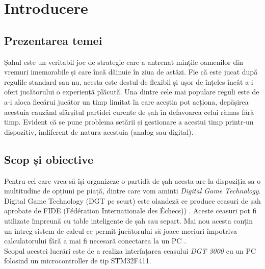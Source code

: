 \chapter{Introducere}
\section{Prezentarea temei}
Șahul este un veritabil joc de strategie care a antrenat mințile oamenilor din vremuri imemorabile și care încă dăinuie în ziua de astăzi. Fie că este jucat după regulile standard sau nu, acesta este destul de flexibil și ușor de înțeles încât a-i oferi jucătorului o experiență plăcută. Una dintre cele mai populare reguli este de a-i aloca fiecărui jucător un timp limitat în care aceștia pot acționa, depășirea acestuia cauzând sfârșitul partidei curente de șah în defavoarea celui rămas fără timp. Evident că se pune problema setării și gestionare a acestui timp printr-un dispozitiv, indiferent de natura acestuia (analog sau digital).

\section{Scop și obiective}
Pentru cel care vrea să își organizeze o partidă de șah acesta are la dispoziția sa o multitudine de opțiuni pe piață, dintre care vom aminti \textit{Digital Game Technology}. Digital Game Technology (DGT pe scurt) este olandeză ce produce ceasuri de șah aprobate de FIDE (Fédération Internationale des Échecs)) \cite{dgt_clock}. Aceste ceasuri pot fi utilizate împreună cu table inteligente de șah sau separt. Mai nou acesta conțin un întreg sistem de calcul ce permit jucătorului să joace meciuri împotriva calculatorului fără a mai fi necesară conectarea la un PC \cite{dgt_computer}. \\
Scopul acestei lucrări este de a realiza interfațarea ceasului \textit{DGT 3000} cu un PC folosind un microcontroller de tip STM32F411.


